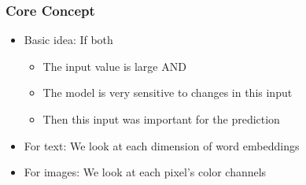 \documentclass{article}
\begin{document}
\subsubsection{Core Concept}
\begin{itemize}
    \item Basic idea: If both
        \begin{itemize}
            \item The input value is large AND
            \item The model is very sensitive to changes in this input
            \item Then this input was important for the prediction
        \end{itemize}
    \item For text: We look at each dimension of word embeddings
    \item For images: We look at each pixel's color channels
\end{itemize}
\end{document}
